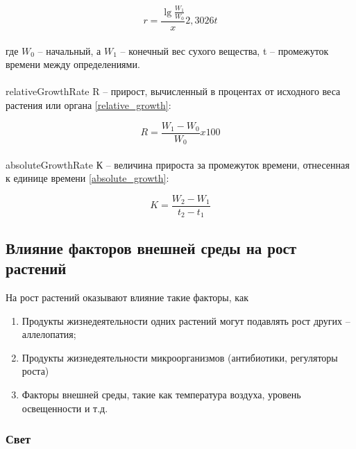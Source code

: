 \begin{equation}
	r=\frac{\lg{\frac{W_{1}}{W_{0}}}} x 2,3026
		{t}
		\label{blekman}
\end{equation}
   
\paragraph*{}где $W_{0}$ – начальный, а $W_{1}$ – конечный вес сухого вещества, t – промежуток времени между определениями.

\paragraph*{}\gls{relativeGrowthRate} R -- прирост, вычисленный в процентах от исходного веса растения или органа \ref{relative_growth}:            

\begin{equation}
	R=\frac{W_{1}-W_{0}}{W_{0}} x 100
	\label{relative_growth}
\end{equation}

\paragraph*{}\gls{absoluteGrowthRate} К -- величина прироста за промежуток времени, отнесенная к единице времени \ref{absolute_growth}:

\begin{equation}
	K=\frac{W_{2}-W_{1}}{t_{2}-t_{1}}
	\label{absolute_growth}
\end{equation}


\subsection*{Влияние факторов внешней среды на рост растений}

На рост растений оказывают влияние такие факторы, как

\begin{enumerate}
	\item Продукты жизнедеятельности одних растений могут подавлять рост других -- аллелопатия;
	\item Продукты жизнедеятельности микроорганизмов (антибиотики, регуляторы роста) 
	\item Факторы внешней среды, такие как температура воздуха, уровень освещенности и т.д.
\end{enumerate} 

\subsubsection*{Свет}

